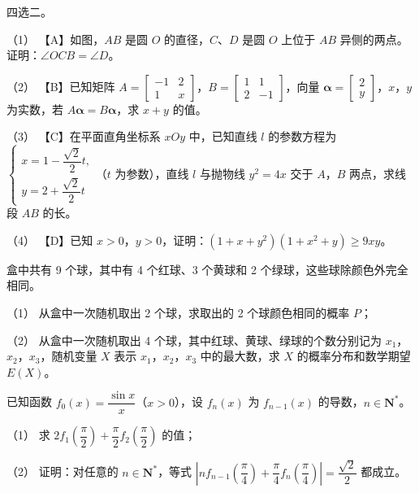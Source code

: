 \Needspace{0.4\textheight}
\begin{question}
四选二。

（1） 【A】如图，$AB$ 是圆 $O$ 的直径，$C$、$D$ 是圆 $O$ 上位于 $AB$ 异侧的两点。证明：$\angle OCB=\angle D$。
\nopagebreak[4]
\begin{center}\end{center}
\nopagebreak[4]
（2） 【B】已知矩阵 $A=\begin{bmatrix}-1&2\\1&x\end{bmatrix}$，$B=\begin{bmatrix}1&1\\2&-1\end{bmatrix}$，向量 $\boldsymbol\alpha=\begin{bmatrix}2\\y\end{bmatrix}$，$x$，$y$ 为实数，若 $A\boldsymbol\alpha=B\boldsymbol\alpha$，求 $x+y$ 的值。

（3） 【C】在平面直角坐标系 $xOy$ 中，已知直线 $l$ 的参数方程为 $\begin{cases}x=1-\dfrac{\sqrt2}{2}t,\\y=2+\dfrac{\sqrt2}{2}t\end{cases}$（$t$ 为参数），直线 $l$ 与抛物线 $y^2=4x$ 交于 $A$，$B$ 两点，求线段 $AB$ 的长。

（4） 【D】已知 $x>0$，$y>0$，证明：$(1+x+y^2)(1+x^2+y)\geqslant 9xy$。

\end{question}
\begin{question}
盒中共有 9 个球，其中有 4 个红球、3 个黄球和 2 个绿球，这些球除颜色外完全相同。

（1） 从盒中一次随机取出 2 个球，求取出的 2 个球颜色相同的概率 $P$；

（2） 从盒中一次随机取出 4 个球，其中红球、黄球、绿球的个数分别记为 $x_1$，$x_2$，$x_3$，随机变量 $X$ 表示 $x_1$，$x_2$，$x_3$ 中的最大数，求 $X$ 的概率分布和数学期望 $E(X)$。

\end{question}
\begin{question}
已知函数 $f_0(x)=\dfrac{\sin x}{x}$（$x>0$），设 $f_n(x)$ 为 $f_{n-1}(x)$ 的导数，$n\in\mathbf N^*$。

（1） 求 $2f_1\left(\dfrac\pi2\right)+\dfrac\pi2f_2\left(\dfrac\pi2\right)$ 的值；

（2） 证明：对任意的 $n\in\mathbf N^*$，等式 $\left|nf_{n-1}\left(\dfrac\pi4\right)+\dfrac\pi4f_n\left(\dfrac\pi4\right)\right|=\dfrac{\sqrt2}{2}$ 都成立。

\end{question}